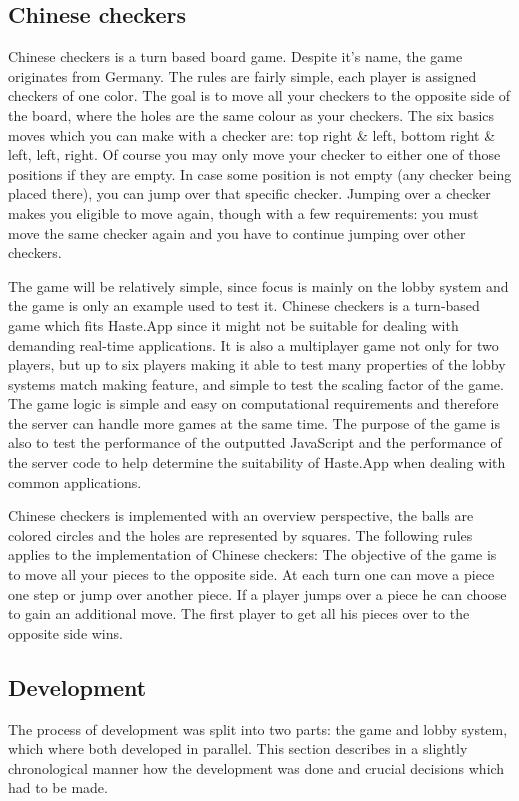 \documentclass[a4paper]{article}
\begin{document}
\subsection{Chinese checkers}
\label{sec:chinesecheckers}
Chinese checkers is a turn based board game. Despite it's name, the game originates from Germany. The rules are fairly simple, each player is assigned checkers of one color. The goal is to move all your checkers to the opposite side
of the board, where the holes are the same colour as your checkers. The six basics moves which you can make with a checker are: top right \& left, bottom right \& left, left, right. Of course you may only move your checker to either one of those positions if they are empty. In case some position is not empty (any checker being placed there), you can jump over that specific checker. Jumping over a checker makes you eligible to move again, though with a few requirements: you must move the same checker again and you have to continue jumping over other checkers.

The game will be relatively simple, since focus is mainly on the lobby system and the game is only an example used to test it. Chinese checkers is a turn-based game which fits Haste.App since it might not be suitable for dealing with demanding real-time applications. It is also a multiplayer game not only for two players, but up to six players making it able to test many properties of the lobby systems match making feature, and simple to test the scaling factor of the game. The game logic is simple and easy on computational requirements and therefore the server can handle more games at the same time. The purpose of the game is also to test the performance of the outputted JavaScript and the performance of the server code to help determine the suitability of Haste.App when dealing with common applications.

Chinese checkers is implemented with an overview perspective, the balls are colored circles and the holes are represented by squares. The following rules applies to the implementation of Chinese checkers: The objective of the game is to move all your pieces to the opposite side. At each turn one can move a piece one step or jump over another piece. If a player jumps over a piece he can choose to gain an additional move. The first player to get all his pieces over to the opposite side wins.


\subsection{Development}
The process of development was split into two parts: the game and lobby system, which where both developed in parallel.
This section describes in a slightly chronological manner how the development was done and crucial decisions which had to be made.
\end{document}
